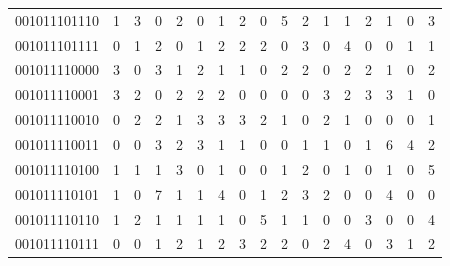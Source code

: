 \documentclass[10pt,a4paper]{article}
\begin{document}
\begin{longtable}{ |c|c|c|c|c|c|c|c|c|c|c|c|c|c|c|c|c| }
    001011101110              & 1                            & 3                                & 0                            & 2                              & 0   & 1   & 2   & 0   & 5   & 2   & 1   & 1   & 2   & 1   & 0   & 3   \\
    001011101111              & 0                            & 1                                & 2                            & 0                              & 1   & 2   & 2   & 2   & 0   & 3   & 0   & 4   & 0   & 0   & 1   & 1   \\
    001011110000              & 3                            & 0                                & 3                            & 1                              & 2   & 1   & 1   & 0   & 2   & 2   & 0   & 2   & 2   & 1   & 0   & 2   \\
    001011110001              & 3                            & 2                                & 0                            & 2                              & 2   & 2   & 0   & 0   & 0   & 0   & 3   & 2   & 3   & 3   & 1   & 0   \\
    001011110010              & 0                            & 2                                & 2                            & 1                              & 3   & 3   & 3   & 2   & 1   & 0   & 2   & 1   & 0   & 0   & 0   & 1   \\
    001011110011              & 0                            & 0                                & 3                            & 2                              & 3   & 1   & 1   & 0   & 0   & 1   & 1   & 0   & 1   & 6   & 4   & 2   \\
    001011110100              & 1                            & 1                                & 1                            & 3                              & 0   & 1   & 0   & 0   & 1   & 2   & 0   & 1   & 0   & 1   & 0   & 5   \\
    001011110101              & 1                            & 0                                & 7                            & 1                              & 1   & 4   & 0   & 1   & 2   & 3   & 2   & 0   & 0   & 4   & 0   & 0   \\
    001011110110              & 1                            & 2                                & 1                            & 1                              & 1   & 1   & 0   & 5   & 1   & 1   & 0   & 0   & 3   & 0   & 0   & 4   \\
    001011110111              & 0                            & 0                                & 1                            & 2                              & 1   & 2   & 3   & 2   & 2   & 0   & 2   & 4   & 0   & 3   & 1   & 2   \\

\end{longtable}
\end{document}
